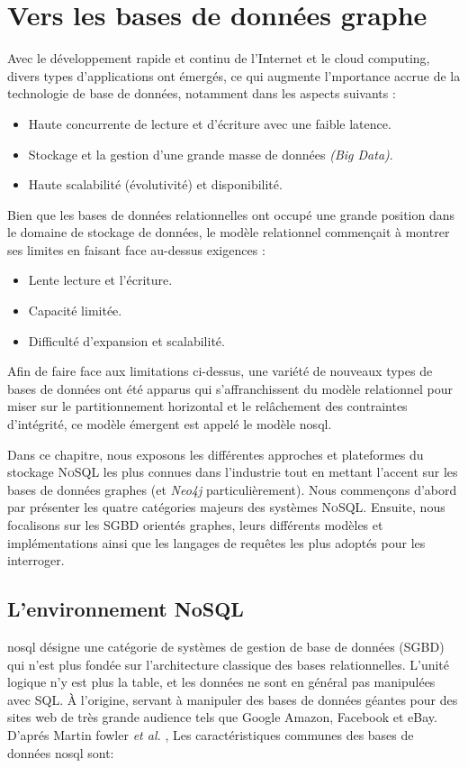 \chapter{Vers les bases de données graphe}
\label{ch:graph-db}
Avec le développement rapide et continu de l'Internet et le cloud
computing, divers types d'applications ont émergés, ce qui augmente
l'mportance accrue de la technologie de base de données, notamment
dans les aspects suivants \cite{han2011survey}:

\begin{itemize}
\item Haute concurrente de lecture et d'écriture avec une faible
  latence.
\item Stockage et la gestion d'une grande masse de données \emph{(Big
    Data)}.
\item Haute scalabilité (évolutivité) et disponibilité.
\end{itemize}

Bien que les bases de données relationnelles ont occupé une grande
position dans le domaine de stockage de données, le modèle relationnel
commençait à montrer ses limites en faisant face au-dessus exigences
\cite{han2011survey}:

\begin{itemize}
\item Lente lecture et l'écriture.
\item Capacité limitée.
\item Difficulté d'expansion et scalabilité.
\end{itemize}

Afin de faire face aux limitations ci-dessus, une variété de nouveaux
types de bases de données ont été apparus qui s'affranchissent du
modèle relationnel pour miser sur le partitionnement horizontal et le
relâchement des contraintes d'intégrité, ce modèle émergent est appelé
le modèle \acrshort{nosql}.

Dans ce chapitre, nous exposons les différentes approches et
plateformes du stockage \textsc{NoSQL} les plus connues dans
l'industrie tout en mettant l'accent sur les bases de données graphes
(et \emph{Neo4j} particulièrement). Nous commençons d'abord par
présenter les quatre catégories majeurs des systèmes
\textsc{NoSQL}. Ensuite, nous focalisons sur les \acrshort{SGBD}
orientés graphes, leurs différents modèles et implémentations ainsi
que les langages de requêtes les plus adoptés pour les interroger.

\section{L'environnement NoSQL}
\label{sec:nosql}
\acrshort{nosql} désigne une catégorie de systèmes de gestion de base
de données (\acrshort{SGBD}) qui n'est plus fondée sur l'architecture
classique des bases relationnelles. L'unité logique n'y est plus la
table, et les données ne sont en général pas manipulées avec
\textsc{SQL}. À l'origine, servant à manipuler des bases de données
géantes pour des sites web de très grande audience tels que Google
Amazon, Facebook et eBay. D'aprés Martin fowler \textit{et al.}
\cite{sadalage2012nosql}, Les caractéristiques communes des bases de
données \acrshort{nosql} sont:

